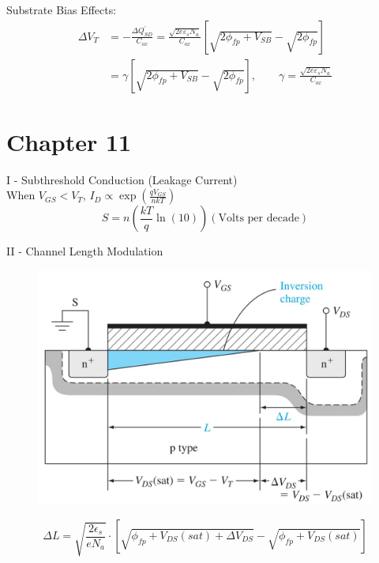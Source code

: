 \documentclass[a4paper, twocolumn]{article}
\begin{document}
    \par Substrate Bias Effects:
    \begin{equation*}
        \boxed{
        \begin{aligned}
            \Delta V_T &= - \frac{\Delta Q^\prime_{SD} }{C_{ox} } = \frac{\sqrt{2 e \varepsilon_s N_a}}{C_{ox} }  \left[ \sqrt{2\phi_{fp} + V_{SB}  } - \sqrt{2 \phi_{fp}}\right] \\
            &= \gamma \left[ \sqrt{2\phi_{fp} + V_{SB}  } - \sqrt{2 \phi_{fp}}\right], \qquad \gamma = \frac{\sqrt{2 e \varepsilon_s N_a}}{C_{ox} }
        \end{aligned}
        }
    \end{equation*}
    
\section{Chapter 11}
    \par I - Subthreshold Conduction (Leakage Current) \\
        When $V_{GS} < V_T$, $I_D \propto \exp\left( \frac{qV_{GS} }{nkT}  \right)$
    \begin{equation*}
        S = n \left( \frac{kT}{q} \ln (10) \right) (\text{Volts per decade})
    \end{equation*}
    \par II - Channel Length Modulation \\
    \begin{figure}[H]
        \centering
        \includegraphics[width=0.9\linewidth]{Channel-length-modulation.jpg}
        \label{fig:Channel-length-modulation.jpg}
    \end{figure}
    \begin{equation*}
        \Delta L=\sqrt{\frac{2\epsilon_s}{eN_a}}\cdot[\sqrt{\phi_{fp}+V_{DS}(sat)+\Delta V_{DS}}-\sqrt{\phi_{fp}+V_{DS}(sat)}]
    \end{equation*}
\end{document}
